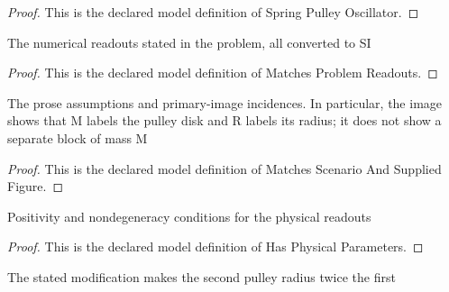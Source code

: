 \begin{proof}
  This is the declared model definition of Spring Pulley Oscillator.
\end{proof}
\begin{definition}
  \label{def:physics:phyx-mini-0235:phyxminiproblems-problemphyxmini0235-matchesproblemreadouts}
  The numerical readouts stated in the problem, all converted to SI
\end{definition}
\begin{proof}
  This is the declared model definition of Matches Problem Readouts.
\end{proof}
\begin{definition}
  \label{def:physics:phyx-mini-0235:phyxminiproblems-problemphyxmini0235-matchesscenarioandsuppliedfigure}
  The prose assumptions and primary-image incidences. In particular, the image shows that M labels the pulley disk and R labels its radius; it does not show a separate block of mass M
\end{definition}
\begin{proof}
  This is the declared model definition of Matches Scenario And Supplied Figure.
\end{proof}
\begin{definition}
  \label{def:physics:phyx-mini-0235:phyxminiproblems-problemphyxmini0235-hasphysicalparameters}
  Positivity and nondegeneracy conditions for the physical readouts
\end{definition}
\begin{proof}
  This is the declared model definition of Has Physical Parameters.
\end{proof}
\begin{definition}
  \label{def:physics:phyx-mini-0235:phyxminiproblems-problemphyxmini0235-satisfiesradiusdoubling}
  The stated modification makes the second pulley radius twice the first
\end{definition}
